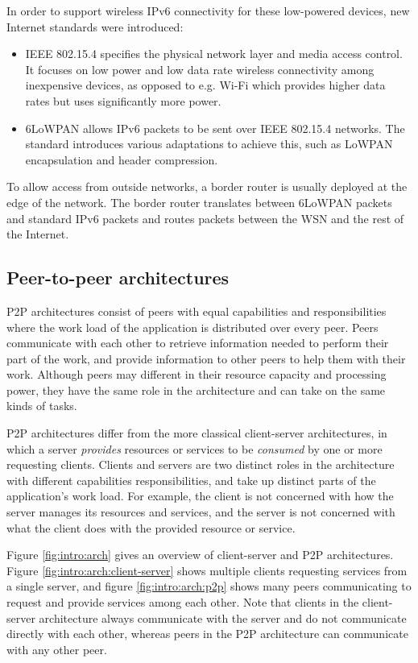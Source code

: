 In order to support wireless \gls{IPv6} connectivity for these low-powered devices, new Internet standards were introduced:
\begin{itemize}
\item \gls{IEEE} 802.15.4 \cite{ieee-802.15.4} specifies the physical network layer and media access control. It focuses on low power and low data rate wireless connectivity among inexpensive devices, as opposed to e.g. Wi-Fi which provides higher data rates but uses significantly more power.
\item \acrfull{6LoWPAN} \cite{rfc6282} allows \gls{IPv6} packets to be sent over \gls{IEEE} 802.15.4 networks. The standard introduces various adaptations to achieve this, such as LoWPAN encapsulation and header compression.
\end{itemize}

To allow access from outside networks, a border router is usually deployed at the edge of the network. The border router translates between \gls{6LoWPAN} packets and standard \gls{IPv6} packets and routes packets between the \gls{WSN} and the rest of the Internet.

\subsection{Peer-to-peer architectures}
\label{sec:intro:p2p}
\Acrfull{P2P} architectures consist of peers with equal capabilities and responsibilities where the work load of the application is distributed over every peer. Peers communicate with each other to retrieve information needed to perform their part of the work, and provide information to other peers to help them with their work. Although peers may different in their resource capacity and processing power, they have the same role in the architecture and can take on the same kinds of tasks.

\Gls{P2P} architectures differ from the more classical client-server architectures, in which a server \emph{provides} resources or services to be \emph{consumed} by one or more requesting clients. Clients and servers are two distinct roles in the architecture with different capabilities responsibilities, and take up distinct parts of the application's work load. For example, the client is not concerned with how the server manages its resources and services, and the server is not concerned with what the client does with the provided resource or service.

Figure \ref{fig:intro:arch} gives an overview of client-server and \gls{P2P} architectures. Figure \ref{fig:intro:arch:client-server} shows multiple clients requesting services from a single server, and figure \ref{fig:intro:arch:p2p} shows many peers communicating to request and provide services among each other. Note that clients in the client-server architecture always communicate with the server and do not communicate directly with each other, whereas peers in the \gls{P2P} architecture can communicate with any other peer.

